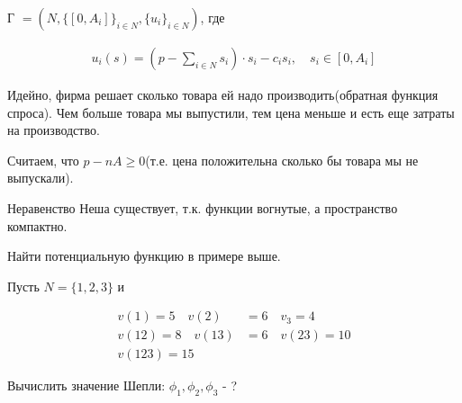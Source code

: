 \documentclass[../main.tex]{subfiles}
\begin{document}
\begin{exmpl}

	Г $= (N, \{[0, A_i]\}_{i \in N}, \{u_i\}_{i \in N})$, где

	\begin{align*}
		u_i(s) = (p - \sum_{i \in N} s_i) \cdot s_i - c_i s_i, \quad s_i \in [0, A_i]
	\end{align*}

	Идейно, фирма решает сколько товара ей надо производить(обратная функция спроса).
	Чем больше товара мы выпустили, тем цена меньше и есть еще затраты на производство.

	Считаем, что $p - n A \geqslant 0$(т.е. цена положительна сколько бы товара мы не выпускали).

	Неравенство Неша существует, т.к. функции вогнутые, а пространство компактно.

\end{exmpl}

\begin{problem}
	Найти потенциальную функцию в примере выше.
\end{problem}

\begin{problem}
	Пусть $N = \{1, 2, 3\}$ и 

	\begin{align*}
		v(1) = 5 \quad v(2) &= 6 \quad v_3 = 4 \\
		v(12) = 8 \quad v(13) &= 6 \quad v(23) = 10 \\
		v(123) = 15
	\end{align*}

	Вычислить значение Шепли:  $\phi_1, \phi_2, \phi_3$ - ?

\end{problem}
\end{document}
